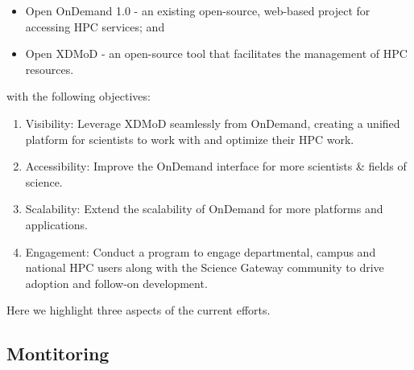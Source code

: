 \documentclass[runningheads]{llncs}
\begin{document}
\begin{itemize}
    \item Open OnDemand 1.0 - an existing open-source, web-based project for accessing HPC services; and
    \item Open XDMoD - an open-source tool that facilitates the management of HPC resources.
\end{itemize}

\noindent with the following objectives:

\begin{enumerate}
    \item Visibility: Leverage XDMoD seamlessly from OnDemand, creating a unified platform for scientists to work with and optimize their HPC work.  
    \item Accessibility: Improve the OnDemand interface for more scientists \& fields of science.  
    \item Scalability: Extend the scalability of OnDemand for more platforms and applications.  
    \item Engagement: Conduct a program to engage departmental, campus and national HPC users along with the Science Gateway community to drive adoption and follow-on development.
\end{enumerate}

\noindent Here we highlight three aspects of the current efforts.

\subsection{Montitoring}
\end{document}
